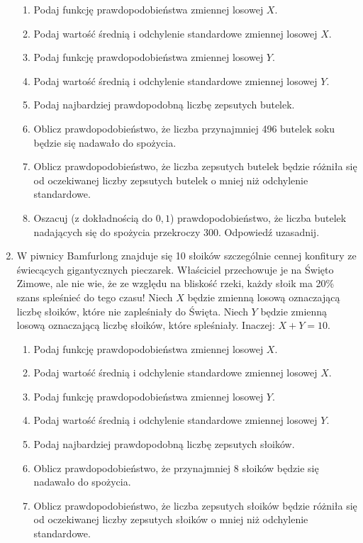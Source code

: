\documentclass[twoside]{mwart}
\begin{document}
\begin{enumerate}
\begin{enumerate}
\item Podaj funkcję prawdopodobieństwa zmiennej losowej $X$.
\item Podaj wartość średnią i odchylenie standardowe zmiennej losowej $X$.
\item Podaj funkcję prawdopodobieństwa zmiennej losowej $Y$.
\item Podaj wartość średnią i odchylenie standardowe zmiennej losowej $Y$.
\item Podaj najbardziej prawdopodobną liczbę zepsutych butelek.
\item Oblicz prawdopodobieństwo, że liczba przynajmniej 496 butelek soku będzie się nadawało do spożycia.
\item Oblicz prawdopodobieństwo, że liczba zepsutych butelek będzie różniła się od oczekiwanej liczby zepsutych butelek o mniej niż odchylenie standardowe.
\item Oszacuj (z dokładnością do $0{,}1$) prawdopodobieństwo, że liczba butelek nadających się do spożycia przekroczy 300. Odpowiedź uzasadnij.
\end{enumerate}
\item W piwnicy Bamfurlong znajduje się 10 słoików szczególnie cennej konfitury ze świecących gigantycznych pieczarek.
Właściciel przechowuje je na Święto Zimowe, ale nie wie, że ze względu na bliskość rzeki, każdy słoik ma 20\% szans spleśnieć do tego czasu!
Niech $X$ będzie zmienną losową oznaczającą liczbę słoików, które nie zapleśniały do Święta.
Niech $Y$ będzie zmienną losową oznaczającą liczbę słoików, które spleśniały.
Inaczej: $X+Y=10$.

\begin{enumerate}
\item Podaj funkcję prawdopodobieństwa zmiennej losowej $X$.
\item Podaj wartość średnią i odchylenie standardowe zmiennej losowej $X$.
\item Podaj funkcję prawdopodobieństwa zmiennej losowej $Y$.
\item Podaj wartość średnią i odchylenie standardowe zmiennej losowej $Y$.
\item Podaj najbardziej prawdopodobną liczbę zepsutych słoików.
\item Oblicz prawdopodobieństwo, że przynajmniej 8 słoików będzie się nadawało do spożycia.
\item Oblicz prawdopodobieństwo, że liczba zepsutych słoików będzie różniła się od oczekiwanej liczby zepsutych słoików o mniej niż odchylenie standardowe.
\end{enumerate}


\end{enumerate}
\end{document}
